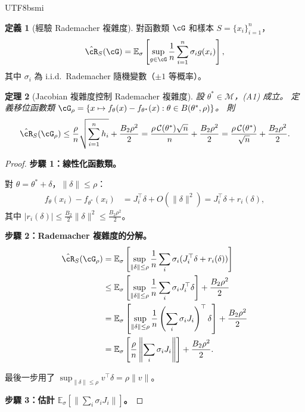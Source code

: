 \documentclass[11pt,a4paper]{article}
\newtheorem{theorem}{定理}
\theoremstyle{definition}
\newtheorem{definition}[theorem]{定義}
\newcommand{\E}{\mathbb{E}}
\newcommand{\cM}{\mathcal{M}}
\newcommand{\cC}{\mathcal{C}}
\begin{document}
\begin{CJK}{UTF8}{bsmi}
\begin{definition}[經驗 Rademacher 複雜度]
  對函數類 $\cG$ 和樣本 $S=\{x_i\}_{i=1}^n$，
  \[
    \hat{\cR}_S(\cG) = \E_\sigma\left[\sup_{g\in\cG}\frac{1}{n}\sum_{i=1}^n\sigma_i g(x_i)\right],
  \]
  其中 $\sigma_i$ 為 i.i.d.\ Rademacher 隨機變數（$\pm 1$ 等概率）。
\end{definition}

\begin{theorem}[Jacobian 複雜度控制 Rademacher 複雜度]\label{thm:rademacher}
  設 $\theta^*\in\cM$，(A1) 成立。
  定義移位函數類 $\cG_\rho=\{x\mapsto f_\theta(x)-f_{\theta^*}(x):\theta\in B(\theta^*,\rho)\}$。
  則
  \begin{equation}\label{eq:rad-bound}
    \hat{\cR}_S(\cG_\rho) \leq \frac{\rho}{n}\sqrt{\sum_{i=1}^n h_i} + \frac{B_2\rho^2}{2}
    = \frac{\rho\,\cC(\theta^*)\sqrt{n}}{n} + \frac{B_2\rho^2}{2}
    = \frac{\rho\,\cC(\theta^*)}{\sqrt{n}} + \frac{B_2\rho^2}{2}.
  \end{equation}
\end{theorem}

\begin{proof}
  \textbf{步驟 1：線性化函數類。}

  對 $\theta=\theta^*+\delta$，$\|\delta\|\leq\rho$：
  \begin{align*}
    f_\theta(x_i)-f_{\theta^*}(x_i)
    &= J_i^\top\delta + O(\|\delta\|^2)
    = J_i^\top\delta + r_i(\delta),
  \end{align*}
  其中 $|r_i(\delta)|\leq\frac{B_2}{2}\|\delta\|^2\leq\frac{B_2\rho^2}{2}$。

  \textbf{步驟 2：Rademacher 複雜度的分解。}
  \begin{align*}
    \hat{\cR}_S(\cG_\rho)
    &= \E_\sigma\left[\sup_{\|\delta\|\leq\rho}\frac{1}{n}\sum_i\sigma_i(J_i^\top\delta+r_i(\delta))\right]\\
    &\leq \E_\sigma\left[\sup_{\|\delta\|\leq\rho}\frac{1}{n}\sum_i\sigma_i J_i^\top\delta\right]
    + \frac{B_2\rho^2}{2}\\
    &= \E_\sigma\left[\sup_{\|\delta\|\leq\rho}\frac{1}{n}\left(\sum_i\sigma_i J_i\right)^\top\delta\right]
    + \frac{B_2\rho^2}{2}\\
    &= \E_\sigma\left[\frac{\rho}{n}\left\|\sum_i\sigma_i J_i\right\|\right]
    + \frac{B_2\rho^2}{2}.
  \end{align*}

  最後一步用了 $\sup_{\|\delta\|\leq\rho}v^\top\delta=\rho\|v\|$。

  \textbf{步驟 3：估計 $\E_\sigma[\|\sum_i\sigma_i J_i\|]$。}


\end{proof}
\end{CJK}
\end{document}
